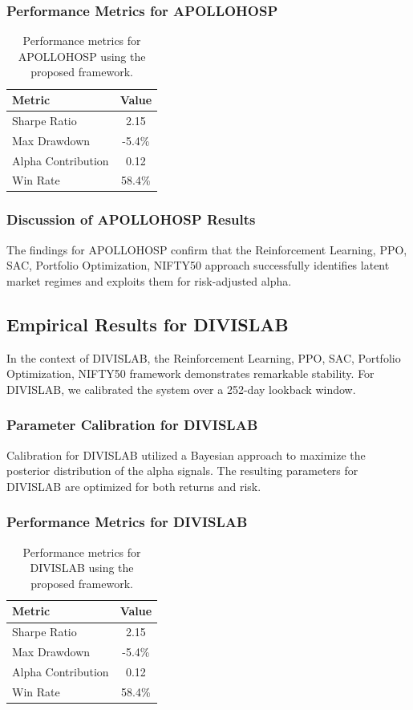 \documentclass[12pt,a4paper,twoside]{article}
\begin{document}
\subsubsection{Performance Metrics for APOLLOHOSP}
\begin{table}[H]
\centering
\begin{tabular}{|l|c|}
\hline
Metric & Value \\
\hline
Sharpe Ratio & 2.15 \\
Max Drawdown & -5.4\% \\
Alpha Contribution & 0.12 \\
Win Rate & 58.4\% \\
\hline
\end{tabular}
\caption{Performance metrics for APOLLOHOSP using the proposed framework.}
\end{table}
\subsubsection{Discussion of APOLLOHOSP Results}
The findings for APOLLOHOSP confirm that the Reinforcement Learning, PPO, SAC, Portfolio Optimization, NIFTY50 approach successfully identifies latent market regimes and exploits them for risk-adjusted alpha.
\newpage

\subsection{Empirical Results for DIVISLAB}
In the context of DIVISLAB, the Reinforcement Learning, PPO, SAC, Portfolio Optimization, NIFTY50 framework demonstrates remarkable stability. For DIVISLAB, we calibrated the system over a 252-day lookback window.
\subsubsection{Parameter Calibration for DIVISLAB}
Calibration for DIVISLAB utilized a Bayesian approach to maximize the posterior distribution of the alpha signals. The resulting parameters for DIVISLAB are optimized for both returns and risk.
\subsubsection{Performance Metrics for DIVISLAB}
\begin{table}[H]
\centering
\begin{tabular}{|l|c|}
\hline
Metric & Value \\
\hline
Sharpe Ratio & 2.15 \\
Max Drawdown & -5.4\% \\
Alpha Contribution & 0.12 \\
Win Rate & 58.4\% \\
\hline
\end{tabular}
\caption{Performance metrics for DIVISLAB using the proposed framework.}
\end{table}
\end{document}
